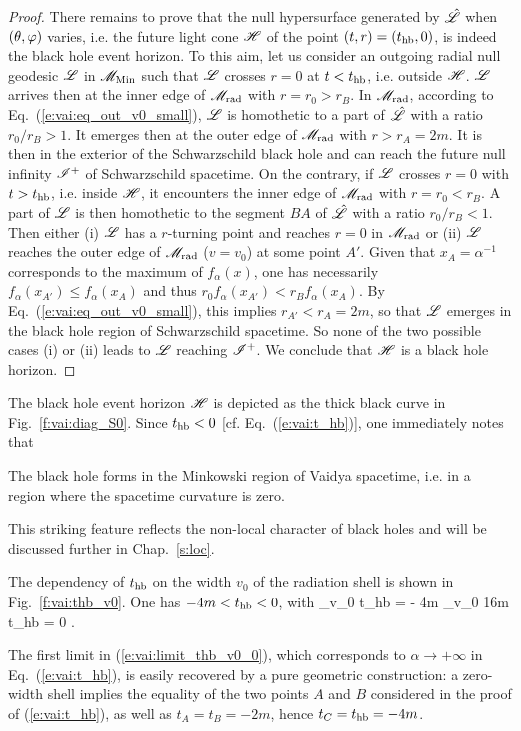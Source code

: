 \begin{proof}
There remains to prove that the null hypersurface generated by
$\hat{\mathscr{L}}$ when $(\theta,\varphi)$ varies, i.e. the future light cone $\mathscr{H}$
of the point $(t, r) = (t_{\rm hb}, 0)$, is indeed the black hole event
horizon. To this aim, let us consider an outgoing radial null geodesic $\mathscr{L}$
in $\mathscr{M}_{\rm Min}$ such that $\mathscr{L}$ crosses $r=0$ at $t < t_{\rm hb}$,
i.e. outside $\mathscr{H}$.
$\mathscr{L}$ arrives then at the inner edge of $\mathscr{M}_{\rm rad}$
with $r = r_0 > r_B$.  In $\mathscr{M}_{\rm rad}$,
according to Eq.~(\ref{e:vai:eq_out_v0_small}),
$\mathscr{L}$ is homothetic to a part of $\hat{\mathscr{L}}$ with a ratio $r_0 / r_B > 1$. It emerges
then at the outer edge of $\mathscr{M}_{\rm rad}$ with $r > r_A = 2 m$. It is
then in the exterior of the Schwarzschild black hole and can reach
the future null infinity $\mathscr{I}^+$ of Schwarzschild spacetime.
On the contrary, if $\mathscr{L}$ crosses $r=0$ with $t > t_{\rm hb}$,
i.e. inside $\mathscr{H}$,
it encounters the inner edge of $\mathscr{M}_{\rm rad}$ with
$r = r_0 < r_B$. A part of $\mathscr{L}$ is then homothetic to the segment $BA$ of
$\hat{\mathscr{L}}$ with a ratio $r_0 / r_B < 1$. Then either (i) $\mathscr{L}$ has a
$r$-turning point and reaches $r=0$
in $\mathscr{M}_{\rm rad}$ or (ii) $\mathscr{L}$ reaches
the outer edge of $\mathscr{M}_{\rm rad}$ ($v = v_0$) at some point $A'$.
Given that $x_A = \alpha^{-1}$ corresponds to the maximum of $f_\alpha(x)$, one
has necessarily $f_\alpha(x_{A'}) \leq f_\alpha(x_A)$ and thus
$r_0 f_\alpha(x_{A'}) < r_B f_\alpha(x_A)$. By
Eq.~(\ref{e:vai:eq_out_v0_small}), this implies $r_{A'} < r_A = 2m$, so
that $\mathscr{L}$ emerges in the black hole region of Schwarzschild spacetime.
So none of the two possible cases (i) or (ii) leads to $\mathscr{L}$ reaching
$\mathscr{I}^+$. We conclude that $\mathscr{H}$ is a black hole
horizon.
\end{proof}

The black hole event horizon $\mathscr{H}$ is depicted as the thick black curve
in Fig.~\ref{f:vai:diag_S0}. Since $t_{\rm hb} < 0$ [cf. Eq.~(\ref{e:vai:t_hb})],
one immediately notes that
\begin{greybox}
The black hole forms in the Minkowski
region of Vaidya spacetime, i.e. in a region where the spacetime curvature
is zero.
\end{greybox}
This striking feature reflects the non-local character of black holes and
will be discussed further in Chap.~\ref{s:loc}.

The dependency of $t_{\rm hb}$
on the width $v_0$ of the radiation shell is shown in Fig.~\ref{f:vai:thb_v0}.
One has $-4m < t_{\rm hb} < 0$, with
\be \label{e:vai:limit_thb_v0_0}
    \lim_{v_0 } t_{\rm hb} = - 4m \qand
     \lim_{v_0 \to 16m} t_{\rm hb} = 0 .
\ee
\begin{remark}
The first limit in (\ref{e:vai:limit_thb_v0_0}), which corresponds to $\alpha\to +\infty$ in Eq.~(\ref{e:vai:t_hb}),
is easily recovered by a pure geometric construction: a zero-width
shell implies the equality of the two points $A$ and $B$ considered in the
proof of (\ref{e:vai:t_hb}), as well as $t_A = t_B = - 2m$, hence
$t_C = t_{\rm hb} = - 4 m$.
\end{remark}

